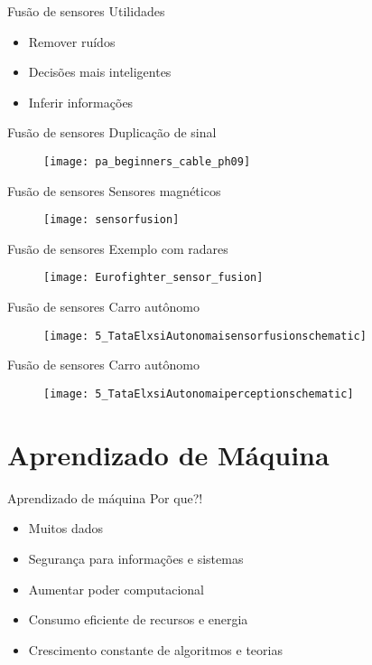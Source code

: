 \documentclass[t]{beamer}
\begin{document}
\begin{frame}{Fusão de sensores}
Utilidades
\begin{itemize}
	\item Remover ruídos
	\item Decisões mais inteligentes
	\item Inferir informações
\end{itemize}
\end{frame}

\begin{frame}{Fusão de sensores}
Duplicação de sinal
\begin{figure}
	\texttt{[image: pa\_beginners\_cable\_ph09]}
\end{figure}
\end{frame}

\begin{frame}{Fusão de sensores}
Sensores magnéticos
\begin{figure}
	\texttt{[image: sensorfusion]}
\end{figure}
\end{frame}

\begin{frame}{Fusão de sensores}
Exemplo com radares
\begin{figure}
	\texttt{[image: Eurofighter\_sensor\_fusion]}
\end{figure}
\end{frame}

\begin{frame}{Fusão de sensores}
Carro autônomo
\begin{figure}
	\texttt{[image: 5\_TataElxsiAutonomaisensorfusionschematic]}
\end{figure}
\end{frame}

\begin{frame}{Fusão de sensores}
Carro autônomo
\begin{figure}
	\texttt{[image: 5\_TataElxsiAutonomaiperceptionschematic]}
\end{figure}
\end{frame}

\section{Aprendizado de Máquina}


\begin{frame}{Aprendizado de máquina}
Por que?!
\begin{itemize}
	\item Muitos dados
	\item Segurança para informações e sistemas
	\item Aumentar poder computacional
	\item Consumo eficiente de recursos e energia
	\item Crescimento constante de algoritmos e teorias
\end{itemize}
\end{frame}
\end{document}
